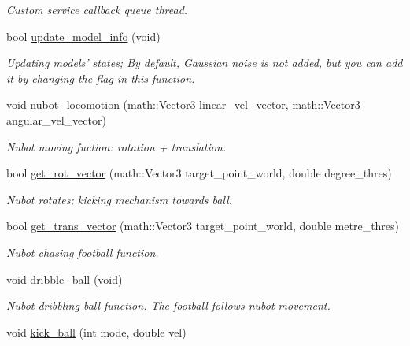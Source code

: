 \begin{DoxyCompactItemize}
\begin{DoxyCompactList}\small\item\em Custom service callback queue thread. \end{DoxyCompactList}\item 
bool \hyperlink{classgazebo_1_1NubotGazebo_a3b884175db3fd9e7ac88f6076d5f2b8e}{update\-\_\-model\-\_\-info} (void)
\begin{DoxyCompactList}\small\item\em Updating models' states; By default, Gaussian noise is not added, but you can add it by changing the flag in this function. \end{DoxyCompactList}\item 
void \hyperlink{classgazebo_1_1NubotGazebo_ad93752507f23724bba2f731325e4c14b}{nubot\-\_\-locomotion} (math\-::\-Vector3 linear\-\_\-vel\-\_\-vector, math\-::\-Vector3 angular\-\_\-vel\-\_\-vector)
\begin{DoxyCompactList}\small\item\em Nubot moving fuction\-: rotation + translation. \end{DoxyCompactList}\item 
bool \hyperlink{classgazebo_1_1NubotGazebo_a8ac8c9467b8e14b4ceb0718d97031617}{get\-\_\-rot\-\_\-vector} (math\-::\-Vector3 target\-\_\-point\-\_\-world, double degree\-\_\-thres)
\begin{DoxyCompactList}\small\item\em Nubot rotates; kicking mechanism towards ball. \end{DoxyCompactList}\item 
bool \hyperlink{classgazebo_1_1NubotGazebo_a0a50fbb4be79c99cf860b84413f8fa9b}{get\-\_\-trans\-\_\-vector} (math\-::\-Vector3 target\-\_\-point\-\_\-world, double metre\-\_\-thres)
\begin{DoxyCompactList}\small\item\em Nubot chasing football function. \end{DoxyCompactList}\item 
void \hyperlink{classgazebo_1_1NubotGazebo_a91862269320f78bc24856e8877af3cc4}{dribble\-\_\-ball} (void)
\begin{DoxyCompactList}\small\item\em Nubot dribbling ball function. The football follows nubot movement. \end{DoxyCompactList}\item 
void \hyperlink{classgazebo_1_1NubotGazebo_a0b8f02255ccde5f6768afb45fee8b81b}{kick\-\_\-ball} (int mode, double vel)

\end{DoxyCompactItemize}
